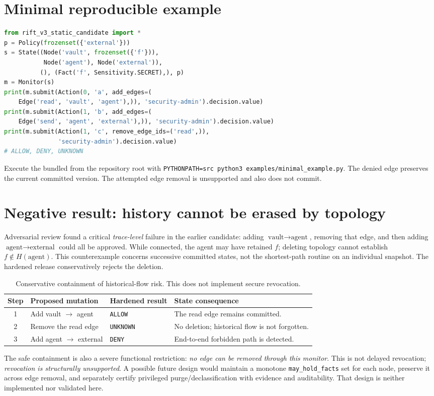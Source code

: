 \documentclass[11pt,letterpaper]{article}
\begin{document}
\section{Minimal reproducible example}
\begin{lstlisting}[language=Python]
from rift_v3_static_candidate import *
p = Policy(frozenset({'external'}))
s = State((Node('vault', frozenset({'f'})),
           Node('agent'), Node('external')),
          (), (Fact('f', Sensitivity.SECRET),), p)
m = Monitor(s)
print(m.submit(Action(0, 'a', add_edges=(
    Edge('read', 'vault', 'agent'),)), 'security-admin').decision.value)
print(m.submit(Action(1, 'b', add_edges=(
    Edge('send', 'agent', 'external'),)), 'security-admin').decision.value)
print(m.submit(Action(1, 'c', remove_edge_ids=('read',)),
               'security-admin').decision.value)
# ALLOW, DENY, UNKNOWN
\end{lstlisting}
\noindent Execute the bundled  from the repository root with \texttt{PYTHONPATH=src python3 examples/minimal\_example.py}. The denied edge preserves the current committed version. The attempted edge removal is unsupported and also does not commit.

\section{Negative result: history cannot be erased by topology}
Adversarial review found a critical \emph{trace-level} failure in the earlier candidate: adding $\text{vault}\to\text{agent}$, removing that edge, and then adding $\text{agent}\to\text{external}$ could all be approved. While connected, the agent may have retained $f$; deleting topology cannot establish $f\notin H(\text{agent})$. This counterexample concerns successive committed states, not the shortest-path routine on an individual snapshot. The hardened release conservatively rejects the deletion.
\begin{table}[H]
\centering\small
\begin{tabularx}{\linewidth}{@{}cllX@{}}\toprule
Step & Proposed mutation & Hardened result & State consequence\\\midrule
1 & Add vault $\to$ agent & \texttt{ALLOW} & The read edge remains committed.\\
2 & Remove the read edge & \texttt{UNKNOWN} & No deletion; historical flow is not forgotten.\\
3 & Add agent $\to$ external & \texttt{DENY} & End-to-end forbidden path is detected.\\\bottomrule
\end{tabularx}
\caption{Conservative containment of historical-flow risk. This does not implement secure revocation.}
\end{table}
\noindent The safe containment is also a severe functional restriction: \emph{no edge can be removed through this monitor}. This is not delayed revocation; \emph{revocation is structurally unsupported}. A possible future design would maintain a monotone \texttt{may\_hold\_facts} set for each node, preserve it across edge removal, and separately certify privileged purge/declassification with evidence and auditability. That design is neither implemented nor validated here.
\end{document}
